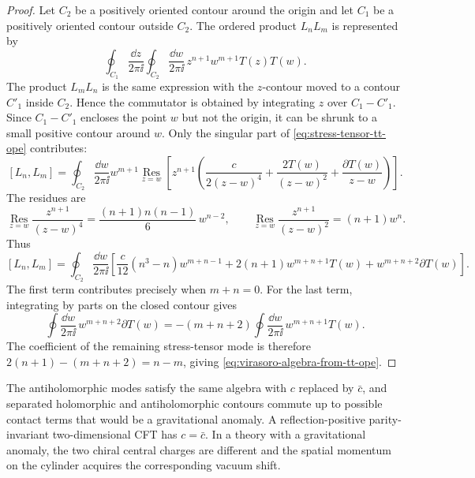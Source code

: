\begin{proof}
Let \(C_2\) be a positively oriented contour around the origin and let
\(C_1\) be a positively oriented contour outside \(C_2\).  The ordered product
\(L_nL_m\) is represented by
\[
  \oint_{C_1}\frac{\dd z}{2\pi\ii}
  \oint_{C_2}\frac{\dd w}{2\pi\ii}\,
  z^{n+1}w^{m+1}T(z)T(w).
\]
The product \(L_mL_n\) is the same expression with the \(z\)-contour moved to
a contour \(C'_1\) inside \(C_2\).  Hence the commutator is obtained by
integrating \(z\) over \(C_1-C'_1\).  Since \(C_1-C'_1\) encloses the point
\(w\) but not the origin, it can be shrunk to a small positive contour around
\(w\).  Only the singular part of \eqref{eq:stress-tensor-tt-ope}
contributes:
\[
  [L_n,L_m]
  =
  \oint_{C_2}\frac{\dd w}{2\pi\ii}
  w^{m+1}
  \operatorname*{Res}_{z=w}
  \left[
    z^{n+1}
    \left(
      \frac{c}{2(z-w)^4}
      +
      \frac{2T(w)}{(z-w)^2}
      +
      \frac{\partial T(w)}{z-w}
    \right)
  \right].
\]
The residues are
\[
  \operatorname*{Res}_{z=w}\frac{z^{n+1}}{(z-w)^4}
  =
  \frac{(n+1)n(n-1)}6\,w^{n-2},
  \qquad
  \operatorname*{Res}_{z=w}\frac{z^{n+1}}{(z-w)^2}
  =
  (n+1)w^n .
\]
Thus
\[
  [L_n,L_m]
  =
  \oint_{C_2}\frac{\dd w}{2\pi\ii}
  \left[
    \frac{c}{12}(n^3-n)w^{m+n-1}
    +
    2(n+1)w^{m+n+1}T(w)
    +
    w^{m+n+2}\partial T(w)
  \right].
\]
The first term contributes precisely when \(m+n=0\).  For the last term,
integrating by parts on the closed contour gives
\[
  \oint\frac{\dd w}{2\pi\ii}\,
  w^{m+n+2}\partial T(w)
  =
  -(m+n+2)
  \oint\frac{\dd w}{2\pi\ii}\,
  w^{m+n+1}T(w).
\]
The coefficient of the remaining stress-tensor mode is therefore
\(2(n+1)-(m+n+2)=n-m\), giving
\eqref{eq:virasoro-algebra-from-tt-ope}.
\end{proof}

\begin{remark}
The antiholomorphic modes satisfy the same algebra with \(c\) replaced by
\(\bar c\), and separated holomorphic and antiholomorphic contours commute up
to possible contact terms that would be a gravitational anomaly.  A
reflection-positive parity-invariant two-dimensional CFT has \(c=\bar c\).
In a theory with a gravitational anomaly, the two chiral central charges are
different and the spatial momentum on the cylinder acquires the corresponding
vacuum shift.
\end{remark}

